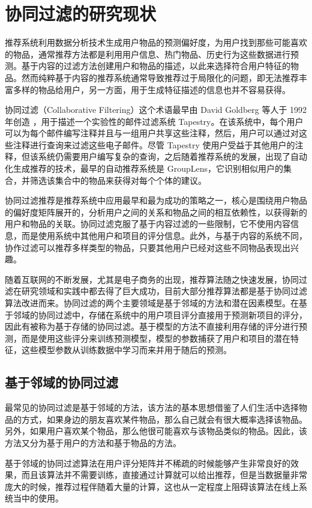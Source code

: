 \chapter{协同过滤的研究现状}
推荐系统利用数据分析技术生成用户物品的预测偏好度，为用户找到那些可能喜欢的物品，通常推荐方法都是利用用户信息、热门物品、历史行为这些数据进行预测。基于内容的过滤方法创建用户和物品的描述，以此来选择符合用户特征的物品。然而纯粹基于内容的推荐系统通常导致推荐过于局限化的问题，即无法推荐丰富多样的物品给用户，另一方面，用于生成特征描述的信息也并不容易获得。

协同过滤（Collaborative Filtering）这个术语最早由 David Goldberg 等人于 1992 年创造 ，用于描述一个实验性的邮件过滤系统 Tapestry\cite{Goldberg1992Using}。在该系统中，每个用户可以为每个邮件编写注释并且与一组用户共享这些注释，然后，用户可以通过对这些注释进行查询来过滤这些电子邮件。尽管 Tapestry 使用户受益于其他用户的注释，但该系统仍需要用户编写复杂的查询，之后随着推荐系统的发展，出现了自动化生成推荐的技术，最早的自动推荐系统是 GroupLens，它识别相似用户的集合，并筛选该集合中的物品来获得对每个个体的建议。

协同过滤推荐是推荐系统中应用最早和最为成功的策略之一，核心是围绕用户物品的偏好度矩阵展开的，分析用户之间的关系和物品之间的相互依赖性，以获得新的用户和物品的关联。协同过滤克服了基于内容过滤的一些限制，它不使用内容信息，而是使用系统中其他用户和项目的评分信息。此外，与基于内容的系统不同，协作过滤可以推荐多样类型的物品，只要其他用户已经对这些不同物品表现出兴趣。

随着互联网的不断发展，尤其是电子商务的出现，推荐算法随之快速发展，协同过滤在研究领域和实践中都去得了巨大成功，目前大部分推荐算法都是基于协同过滤算法改进而来。协同过滤的两个主要领域是基于邻域的方法和潜在因素模型。在基于邻域的协同过滤中，存储在系统中的用户项目评分直接用于预测新项目的评分，因此有被称为基于存储的协同过滤。基于模型的方法不直接利用存储的评分进行预测，而是使用这些评分来训练预测模型，模型的参数捕获了用户和项目的潜在特征，这些模型参数从训练数据中学习而来并用于随后的预测。

\section{基于邻域的协同过滤}
最常见的协同过滤是基于邻域的方法，该方法的基本思想借鉴了人们生活中选择物品的方式，如果身边的朋友喜欢某件物品，那么自己就会有很大概率选择该物品。另外，如果用户喜欢某个物品，那么他很可能喜欢与该物品类似的物品。因此，该方法又分为基于用户的方法和基于物品的方法。

基于邻域的协同过滤算法在用户评分矩阵并不稀疏的时候能够产生非常良好的效果，而且该算法并不需要训练，直接通过计算就可以给出推荐，但是当数据量非常庞大的时候，推荐过程伴随着大量的计算，这也从一定程度上阻碍该算法在线上系统当中的使用。

